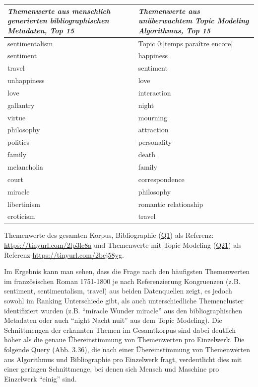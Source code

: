 \documentclass[
  12pt,
  letterpaper,
  DIV=11,
  numbers=noendperiod]{scrreprt}
\begin{document}
\begin{longtable}[]{@{}
  >{\raggedright\arraybackslash}p{}
  >{\raggedright\arraybackslash}p{}@{}}
\toprule\noalign{}
\begin{minipage}[b]{\linewidth}\raggedright
\emph{Themenwerte aus menschlich generierten bibliographischen
Metadaten, Top 15}
\end{minipage} & \begin{minipage}[b]{\linewidth}\raggedright
\emph{Themenwerte aus unüberwachtem Topic Modeling Algorithmus, Top 15}
\end{minipage} \\
\midrule\noalign{}
\endhead
\bottomrule\noalign{}
\endlastfoot
sentimentalism & Topic 0:{[}temps paraître encore{]} \\
sentiment & happiness \\
travel & sentiment \\
unhappiness & love \\
love & interaction \\
gallantry & night \\
virtue & mourning \\
philosophy & attraction \\
politics & personality \\
family & death \\
melancholia & family \\
court & correspondence \\
miracle & philosophy \\
libertinism & romantic relationship \\
eroticism & travel \\
\end{longtable}

Themenwerte des gesamten Korpus, Bibliographie
(\href{http://data.mimotext.uni-trier.de/wiki/Item:Q1}{Q1}) als
Referenz: \url{https://tinyurl.com/2lp3le8a} und Themenwerte mit Topic
Modeling (\href{http://data.mimotext.uni-trier.de/wiki/Item:Q21}{Q21})
als Referenz \url{https://tinyurl.com/2bej58yg}.

Im Ergebnis kann man sehen, dass die Frage nach den häufigsten
Themenwerten im französischen Roman 1751-1800 je nach Referenzierung
Kongruenzen (z.B. sentiment, sentimentalism, travel) aus beiden
Datenquellen zeigt, es jedoch sowohl im Ranking Unterschiede gibt, als
auch unterschiedliche Themencluster identifiziert wurden (z.B. ``miracle
\textbar{} Wunder \textbar{} miracle'' aus den bibliographischen
Metadaten oder auch ``night \textbar{} Nacht \textbar{} nuit'' aus dem
Topic Modeling). Die Schnittmengen der erkannten Themen im Gesamtkorpus
sind dabei deutlich höher als die genaue Übereinstimmung von
Themenwerten pro Einzelwerk. Die folgende Query (Abb. 3.36), die nach
einer Übereinstimmung von Themenwerten aus Algorithmus und Bibliographie
pro Einzelwerk fragt, verdeutlicht dies mit einer geringen Schnittmenge,
bei denen sich Mensch und Maschine pro Einzelwerk ``einig'' sind.
\end{document}
